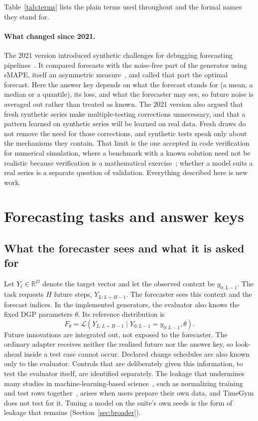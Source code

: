 \documentclass[11pt,a4paper]{article}
\newcommand{\R}{\mathbb{R}}
\begin{document}
Table~\ref{tab:terms} lists the plain terms used throughout and the
formal names they stand for.

\paragraph{What changed since 2021.}
The 2021 version introduced synthetic challenges for debugging forecasting
pipelines~\cite{seca2021timegym}. It compared forecasts with the
noise-free part of the generator using sMAPE, itself an asymmetric
measure~\cite{goodwin1999asymmetry}, and called that part the optimal
forecast. Here the answer key depends on what the forecast stands for (a
mean, a median or a quantile), its loss, and what the forecaster may see,
so future noise is averaged out rather than treated as known. The 2021
version also argued that fresh synthetic series make multiple-testing
corrections unnecessary, and that a pattern learned on synthetic series
will be learned on real data. Fresh draws do not remove the need for
those corrections, and synthetic tests speak only about the mechanisms
they contain. That limit is the one accepted in code verification for
numerical simulation, where a benchmark with a known solution need not be
realistic because verification is a mathematical
exercise~\cite{roache2002code}; whether a model suits a real series is a
separate question of validation. Everything described here is new work.

\section{Forecasting tasks and answer keys}
\label{sec:references}

\subsection{What the forecaster sees and what it is asked for}

Let $Y_t\in\R^D$ denote the target vector and let the observed context be
$y_{0:L-1}$. The task requests $H$ future steps,
$Y_{L:L+H-1}$. The forecaster sees this context and
the forecast indices. In the implemented generators, the evaluator also
knows the fixed DGP parameters $\theta$. Its reference distribution is
\begin{equation}
 F_\theta = \mathcal{L}\!\left(Y_{L:L+H-1}
       \mid Y_{0:L-1}=y_{0:L-1},\theta\right).
\end{equation}
Future innovations are integrated out, not exposed to the forecaster.
The ordinary adapter receives neither the realized future nor the
answer key, so look-ahead inside a test case cannot occur. Declared change schedules are also known only to the
evaluator. Controls that are deliberately given this information, to test
the evaluator itself, are identified separately.
The leakage that undermines many studies in machine-learning-based
science~\cite{kapoor2023leakage}, such as normalizing training and test
rows together~\cite{yang2022data}, arises when users prepare their own
data, and TimeGym does not test for it. Tuning a model on the suite's own
seeds is the form of leakage that remains (Section~\ref{sec:broader}).
\end{document}

